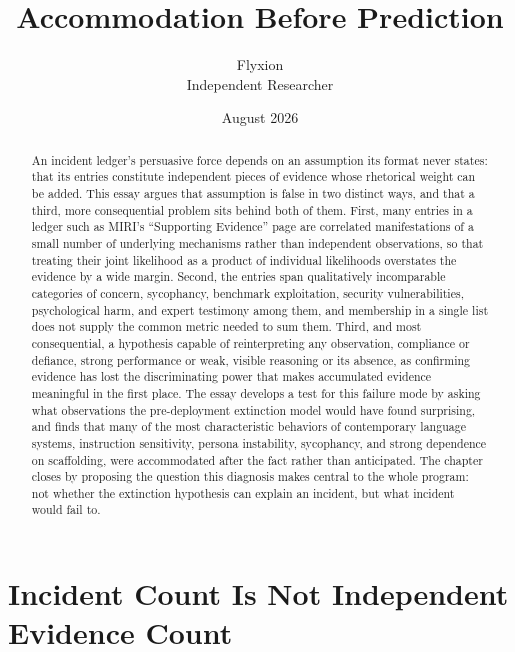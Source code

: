 \documentclass[11pt]{article}
\title{Accommodation Before Prediction}
\author{Flyxion \\ \small Independent Researcher}
\date{August 2026}
\begin{document}
\maketitle

\begin{abstract}
An incident ledger's persuasive force depends on an assumption its format never states: that its entries constitute independent pieces of evidence whose rhetorical weight can be added. This essay argues that assumption is false in two distinct ways, and that a third, more consequential problem sits behind both of them. First, many entries in a ledger such as MIRI's ``Supporting Evidence'' page are correlated manifestations of a small number of underlying mechanisms rather than independent observations, so that treating their joint likelihood as a product of individual likelihoods overstates the evidence by a wide margin. Second, the entries span qualitatively incomparable categories of concern, sycophancy, benchmark exploitation, security vulnerabilities, psychological harm, and expert testimony among them, and membership in a single list does not supply the common metric needed to sum them. Third, and most consequential, a hypothesis capable of reinterpreting any observation, compliance or defiance, strong performance or weak, visible reasoning or its absence, as confirming evidence has lost the discriminating power that makes accumulated evidence meaningful in the first place. The essay develops a test for this failure mode by asking what observations the pre-deployment extinction model would have found surprising, and finds that many of the most characteristic behaviors of contemporary language systems, instruction sensitivity, persona instability, sycophancy, and strong dependence on scaffolding, were accommodated after the fact rather than anticipated. The chapter closes by proposing the question this diagnosis makes central to the whole program: not whether the extinction hypothesis can explain an incident, but what incident would fail to.
\end{abstract}

\section{Incident Count Is Not Independent Evidence Count}
\end{document}
